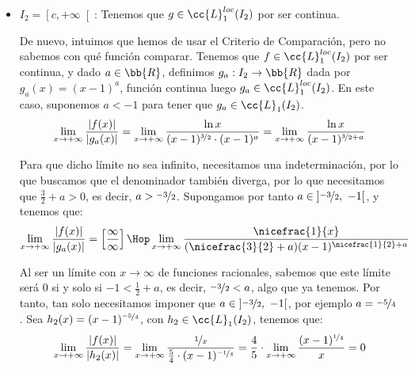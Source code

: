 \begin{ejercicio}
\begin{itemize}
            \begin{observacion}
                Evidentemente, en un examen este razonamiento
                se haría en sucio y tan solo se entregaría el razonamiento hecho directamente con la función $h_1$.
                No obstante, por simples objetivos didácticos, se ha querido mostrar el proceso completo para que el lector sepa razonar cómo obtener dicha función.
            \end{observacion}


        \item \underline{$I_2 = \left[c, +\infty\right[$}: Tenemos que $g\in \cc{L}_1^{loc}(I_2)$ por ser continua.
        
        De nuevo, intuimos que hemos de usar el Criterio de Comparación, pero no sabemos con qué función comparar.
        Tenemos que $f\in \cc{L}_1^{loc}(I_2)$ por ser continua, y dado $a\in \bb{R}$, definimos $g_a:I_2\to \bb{R}$ dada por $g_a(x)=(x-1)^{a}$, función continua luego $g_a\in \cc{L}_1^{loc}(I_2)$.
        En este caso, suponemos $a<-1$ para tener que $g_a\in \cc{L}_1(I_2)$.
        \begin{equation*}
            \lim_{x\to +\infty} \dfrac{|f(x)|}{|g_a(x)|} = \lim_{x\to +\infty} \dfrac{\ln x}{(x-1)^{\nicefrac{3}{2}}\cdot (x-1)^{a}}
            = \lim_{x\to +\infty} \dfrac{\ln x}{(x-1)^{\nicefrac{3}{2}+a}}
        \end{equation*}

        Para que dicho límite no sea infinito, necesitamos una indeterminación,
        por lo que buscamos que el denominador también diverga, por lo que necesitamos que $\frac{3}{2}+a>0$, es decir, $a>\nicefrac{-3}{2}$.
        Supongamos por tanto $a\in \left]\nicefrac{-3}{2},~-1\right[$, y tenemos que:
        \begin{equation*}
            \lim_{x\to +\infty} \dfrac{|f(x)|}{|g_a(x)|} = \left[\dfrac{\infty}{\infty}\right]
            \Hop
            \lim_{x\to +\infty} \dfrac{\nicefrac{1}{x}}{(\nicefrac{3}{2}+a)(x-1)^{\nicefrac{1}{2}+a}}
        \end{equation*}

        Al ser un límite con $x\to \infty$ de funciones racionales,
        sabemos que este límite será $0$ si y solo si $-1<\frac{1}{2}+a$, es decir, $\nicefrac{-3}{2}<a$, algo que ya tenemos.
        Por tanto, tan solo necesitamos imponer que $a\in \left]\nicefrac{-3}{2},~-1\right[$, por ejemplo $a=\nicefrac{-5}{4}$. Sea $h_2(x)=(x-1)^{\nicefrac{-5}{4}}$, con $h_2\in \cc{L}_1(I_2)$, tenemos que:
        \begin{equation*}
            \lim_{x\to +\infty} \dfrac{|f(x)|}{|h_2(x)|}
            =\lim_{x\to +\infty} \dfrac{\nicefrac{1}{x}}{\frac{5}{4}\cdot (x-1)^{\nicefrac{-1}{4}}}
            = \dfrac{4}{5}\cdot \lim_{x\to +\infty} \dfrac{(x-1)^{\nicefrac{1}{4}}}{x} = 0
        \end{equation*}


\end{itemize}
\end{ejercicio}
